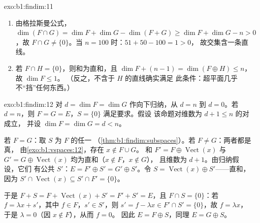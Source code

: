 \begin{solution}{exo:b1:findim:11}
\begin{enumerate}
  \item 由格拉斯曼公式，$\dim(F \cap G) = \dim F + \dim G - \dim(F +
        G) \geq \dim F + \dim G - n > 0$，故 $F \cap G \neq
        \{0\}$。当 $n = 100$ 时：$51 + 50 - 100 = 1 > 0$，
        故交集含一条直线。
  \item 若 $F \cap H = \{0\}$，则和为直和，且 $\dim F +
        (n - 1) = \dim(F \oplus H) \leq n$，故 $\dim F \leq 1$。
        （反之，不含于 $H$ 的直线确实满足
        此条件：超平面几乎不“挡”任何东西。）
\end{enumerate}
\end{solution}

\begin{solution}{exo:b1:findim:12}
对 $d = \dim F = \dim G$ 作向下归纳，从 $d = n$ 到 $d =
0$。若 $d = n$，则 $F = G = E$，$S = \{0\}$ 满足要求。假设
该命题对维数为 $d + 1 \leq n$ 的对成立，
并设 $\dim F = \dim G = d < n$。

若 $F = G$：取 $S$ 为 $F$ 的任一
（\cref{thm:b1:findim:subspaces}）。若 $F \neq G$：两者都是真，
由\cref{exo:b1:vspaces:12}，存在 $x \notin F \cup G$。
和 $F' = F \oplus \operatorname{Vect}(x)$ 与 $G' = G \oplus
\operatorname{Vect}(x)$ 均为直和（$x \notin F$，$x \notin G$），
且维数为 $d + 1$。由归纳假设，它们
有公共 $S'$：$E = F' \oplus S' = G' \oplus
S'$。令 $S = \operatorname{Vect}(x) \oplus S'$——直和，
因为 $S' \cap \operatorname{Vect}(x) \subseteq S' \cap F' =
\{0\}$。

于是 $F + S = F + \operatorname{Vect}(x) + S' = F' + S' = E$，且
$F \cap S = \{0\}$：若 $f = \lambda x + s'$，其中 $f \in F$，$s'
\in S'$，则 $s' = f - \lambda x \in F' \cap S' = \{0\}$，故 $f
= \lambda x$，于是 $\lambda = 0$（因 $x \notin F$），从而 $f = 0$。
因此 $E = F \oplus S$，同理 $E = G \oplus S$。
\end{solution}

